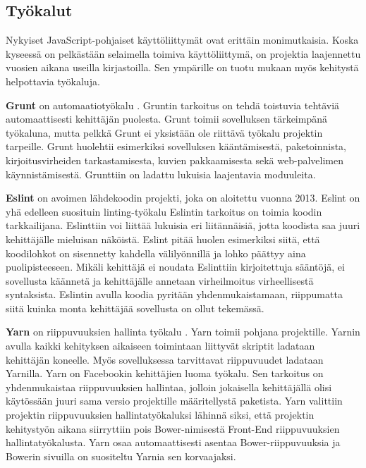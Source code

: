\documentclass{tktltiki}
\begin{document}
\subsection{Työkalut}

Nykyiset JavaScript-pohjaiset käyttöliittymät ovat erittäin monimutkaisia. Koska kyseessä on pelkästään selaimella toimiva käyttöliittymä, on projektia laajennettu vuosien aikana useilla kirjastoilla. Sen ympärille on tuotu mukaan myös kehitystä helpottavia työkaluja.

\textbf{Grunt} on automaatiotyökalu \cite{cryer2015pro}. Gruntin tarkoitus on tehdä toistuvia tehtäviä automaattisesti kehittäjän puolesta. Grunt toimii sovelluksen tärkeimpänä työkaluna, mutta pelkkä Grunt ei yksistään ole riittävä työkalu projektin tarpeille. Grunt huolehtii esimerkiksi sovelluksen kääntämisestä, paketoinnista, kirjoitusvirheiden tarkastamisesta, kuvien pakkaamisesta sekä web-palvelimen käynnistämisestä. Grunttiin on ladattu lukuisia laajentavia moduuleita.

\textbf{Eslint} on avoimen lähdekoodin projekti, joka on aloitettu vuonna 2013. Eslint on yhä edelleen suosituin linting-työkalu \cite{tomasdottir2018adoption} Eslintin tarkoitus on toimia koodin tarkkailijana. Eslinttiin voi liittää lukuisia eri liitännäisiä, jotta koodista saa juuri kehittäjälle mieluisan näköistä. Eslint pitää huolen esimerkiksi siitä, että koodilohkot on sisennetty kahdella välilyönnillä ja lohko päättyy aina puolipisteeseen. Mikäli kehittäjä ei noudata Eslinttiin kirjoitettuja sääntöjä, ei sovellusta käännetä ja kehittäjälle annetaan virheilmoitus virheellisestä syntaksista. Eslintin avulla koodia pyritään yhdenmukaistamaan, riippumatta siitä kuinka monta kehittäjää sovellusta on ollut tekemässä. 

\textbf{Yarn} on riippuvuuksien hallinta työkalu \cite{McKenzie}. Yarn toimii pohjana projektille. Yarnin avulla kaikki kehityksen aikaiseen toimintaan liittyvät skriptit ladataan kehittäjän koneelle. Myös sovelluksessa tarvittavat riippuvuudet ladataan Yarnilla. Yarn on Facebookin kehittäjien luoma työkalu. Sen tarkoitus on yhdenmukaistaa riippuvuuksien hallintaa, jolloin jokaisella kehittäjällä olisi käytössään juuri sama versio projektille määritellystä paketista. Yarn valittiin projektin riippuvuuksien hallintatyökaluksi lähinnä siksi, että projektin kehitystyön aikana siirryttiin pois Bower-nimisestä Front-End riippuvuuksien hallintatyökalusta. Yarn osaa automaattisesti asentaa Bower-riippuvuuksia ja Bowerin sivuilla on suositeltu Yarnia sen korvaajaksi.
\end{document}
